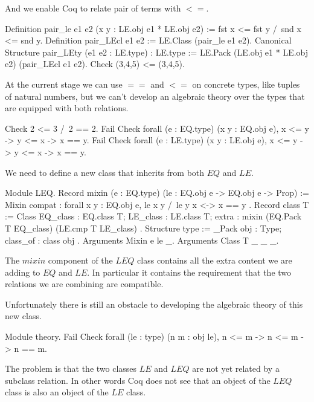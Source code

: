 And we enable Coq to relate pair of terms with $<=$.

\begin{coq_example}
Definition pair_le e1 e2 (x y : LE.obj e1 * LE.obj e2) :=
  fst x <= fst y /\ snd x <= snd y.
Definition pair_LEcl e1 e2 := LE.Class (pair_le e1 e2).
Canonical Structure pair_LEty (e1 e2 : LE.type) : LE.type :=
  LE.Pack (LE.obj e1 * LE.obj e2) (pair_LEcl e1 e2).
Check (3,4,5) <= (3,4,5).
\end{coq_example}

At the current stage we can use $==$ and $<=$ on concrete types,
like tuples of natural numbers, but we can't develop an algebraic
theory over the types that are equipped with both relations.

\begin{coq_example}
Check 2 <= 3 /\ 2 == 2.
Fail Check forall (e : EQ.type) (x y : EQ.obj e), x <= y -> y <= x -> x == y.
Fail Check forall (e : LE.type) (x y : LE.obj e), x <= y -> y <= x -> x == y.
\end{coq_example}

We need to define a new class that inherits from both $EQ$ and $LE$.

\begin{coq_example}
Module LEQ.
  Record mixin (e : EQ.type) (le : EQ.obj e -> EQ.obj e -> Prop) :=
    Mixin { compat : forall x y : EQ.obj e, le x y /\ le y x <-> x == y }.
  Record class T := Class {
    EQ_class    : EQ.class T;
    LE_class    : LE.class T;
    extra : mixin (EQ.Pack T EQ_class) (LE.cmp T LE_class) }.
  Structure type := _Pack { obj : Type; class_of : class obj }.
  Arguments Mixin {e le} _.
  Arguments Class {T} _ _ _.
\end{coq_example}

The $mixin$ component of the $LEQ$ class contains all the extra content
we are adding to $EQ$ and $LE$.  In particular it contains the requirement
that the two relations we are combining are compatible.

Unfortunately there is still an obstacle to developing the algebraic theory
of this new class.

\begin{coq_example}
  Module theory.
  Fail Check forall (le : type) (n m : obj le), n <= m -> n <= m -> n == m.
\end{coq_example}

The problem is that the two classes $LE$ and $LEQ$ are not yet related by
a subclass relation.  In other words Coq does not see that an object
of the $LEQ$ class is also an object of the $LE$ class.

